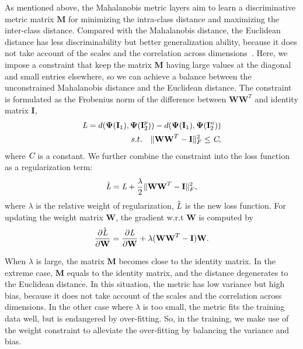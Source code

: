 \documentclass[10pt,twocolumn,letterpaper]{article}
\begin{document}
As mentioned above, the Mahalanobis metric layers aim to learn a discriminative metric matrix $\textbf{M}$ for minimizing the intra-class distance and maximizing the inter-class distance.
Compared with the Mahalanobis distance, the Euclidean distance has less discriminability but better generalization ability, because it does not take account of the scales and the correlation across dimensions~\cite{manly2004multivariate}.
Here, we impose a constraint that keep the matrix $\textbf{M}$ having large values at the diagonal and small entries elsewhere, so we can achieve a balance between the unconstrained Mahalanobis distance and the Euclidean distance.
The constraint is formulated as the Frobenius norm of the difference between $\textbf{W}\textbf{W}^T$ and identity matrix $\mathbf{I}$,
\begin{align}\label{Loss-st}
    \mathbf{\emph{L}} = d(\mathbf{\Psi}(\mathbf{I}_1), \mathbf{\Psi}(\mathbf{I}_2^p)) - d(\mathbf{\Psi}(\mathbf{I}_1), \mathbf{\Psi}(\mathbf{I}_2^n))       \nonumber   \\
    s.t. \quad \|\textbf{W}\textbf{W}^T - \mathbf{I}\|^2_F \leq \emph{C},
\end{align}
where $\emph{C}$ is a constant. We further combine the constraint into the loss function as a regularization term:
\begin{equation}\label{Loss-lambda}
    \hat{ \mathbf{\emph{L}} } = \mathbf{\emph{L}} + \frac{\lambda}{2} \|\textbf{W}\textbf{W}^T - \mathbf{I}\|^2_F,
\end{equation}
where $\lambda$ is the relative weight of regularization, $\hat{ \mathbf{\emph{L}} }$ is the new loss function.
For updating the weight matrix $\textbf{W}$, the gradient w.r.t $\textbf{W}$ is computed by
\begin{equation}\label{Loss-gradient}
    \frac{\partial \hat{ \mathbf{\emph{L}} }}{\partial \textbf{W}} =
    \frac{\partial \mathbf{\emph{L}}}{\partial \textbf{W}} + \lambda (\textbf{W}\textbf{W}^T - \mathbf{I})\textbf{W}.
\end{equation}

When $\lambda$ is large, the matrix $\textbf{M}$ becomes close to the identity matrix.
In the extreme case, $\textbf{M}$ equals to the identity matrix, and the distance
degenerates to the Euclidean distance.
In this situation, the metric has low variance but high bias, because it does not take account of the scales and the correlation across dimensions.
In the other case where $\lambda$ is too small, the metric fits the training data well, but is endangered by over-fitting.
So, in the training, we make use of the weight constraint to alleviate the over-fitting by balancing the variance and bias.
\end{document}
